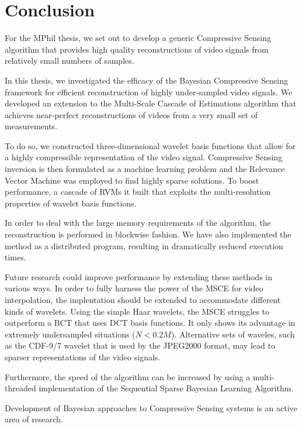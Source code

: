 \chapter{Conclusion}
\label{ch:conclusion}

For the MPhil thesis, we set out to develop a generic Compressive Sensing algorithm that provides high quality reconstructions of video signals from relatively small numbers of samples.


In this thesis, we investigated the efficacy of the Bayesian Compressive Sensing framework for efficient reconstruction of highly under-sampled video signals.
We developed an extension to the Multi-Scale Cascade of Estimations algorithm that achieves near-perfect reconstructions of videos from a very small set of measurements.

To do so, we constructed three-dimensional wavelet basis functions that allow for a highly compressible representation of the video signal.
Compressive Sensing inversion is then formulated as a machine learning problem and the Relevance Vector Machine was employed to find highly sparse solutions.
To boost performance, a cascade of RVMs it built that exploits the multi-resolution properties of wavelet basis functions.

In order to deal with the large memory requirements of the algorithm, the reconstruction is performed in blockwise fashion.
We have also implemented the method as a distributed program, resulting in dramatically reduced execution times.

Future research could improve performance by extending these methods in various ways.
In order to fully harness the power of the MSCE for video interpolation, the implentation should be extended to accommodate different kinds of wavelets.
Using the simple Haar wavelets, the MSCE struggles to outperform a BCT that uses DCT basis functions.
It only shows its advantage in extremely undersampled situations ($N < 0.2M$).
Alternative sets of waveles, such as the CDF-9/7 wavelet that is used by the JPEG2000 format, may lead to sparser representations of the video signals. 

Furthermore, the speed of the algorithm can be increased by using a multi-threaded implementation of the Sequential Sparse Bayesian Learning Algorithm. 

Development of Bayesian approaches to Compressive Sensing systems is an active area of research.


